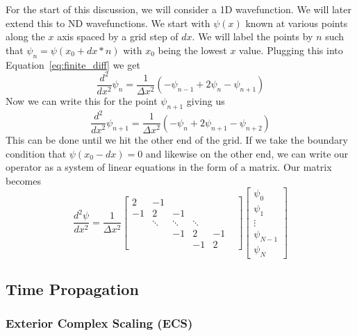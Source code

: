 \documentclass{article}
\begin{document}
For the start of this discussion, we will consider a 1D wavefunction. We will later extend this to ND wavefunctions. We start with $\psi(x)$ known at various points along the $x$ axis spaced by a grid step of $dx$. We will label the points by $n$ such that $\psi_n = \psi(x_0 + dx*n)$ with $x_0$ being the lowest $x$ value. Plugging this into Equation~\ref{eq:finite_diff} we get
\begin{equation}
    \frac{d^2}{dx^2}\psi_n = \frac{1}{\Delta x^2}\left(-\psi_{n-1}+2\psi_n-\psi_{n+1} \right)
    \label{eq:finite_diff_second_order}
\end{equation}
Now we can write this for the point $\psi_{n+1}$ giving us
\begin{equation}
    \frac{d^2}{dx^2}\psi_{n+1} = \frac{1}{\Delta x^2}\left(-\psi_{n}+2\psi_{n+1}-\psi_{n+2} \right)
    \label{eq:finite_diff_second_order_n+1}
\end{equation}
This can be done until we hit the other end of the grid. If we take the boundary condition that $\psi(x_0-dx)=0$ and likewise on the other end, we can write our operator as a system of linear equations in the form of a matrix. Our matrix becomes
\begin{equation}
\frac{d^2\psi}{dx^2} =
\frac{1}{\Delta x^2}
\begin{bmatrix}
    2 & -1 &  &  &   &  \\
    -1 & 2 & -1 &  &  &  \\
     & \ddots & \ddots & \ddots & \\
     &  & -1 & 2 & -1\\
     &   &  & -1 & 2
\end{bmatrix}
\begin{bmatrix}
    \psi_{0} \\
    \psi_{1} \\
    \vdots  \\
    \psi_{N-1}  \\
    \psi_{N}
\end{bmatrix}
\end{equation}

\subsection{Time Propagation} %
\label{sub:time_propagation}

\subsubsection{Exterior Complex Scaling (ECS)} %
\label{ssub:exterer_complex_scaling}
\end{document}
